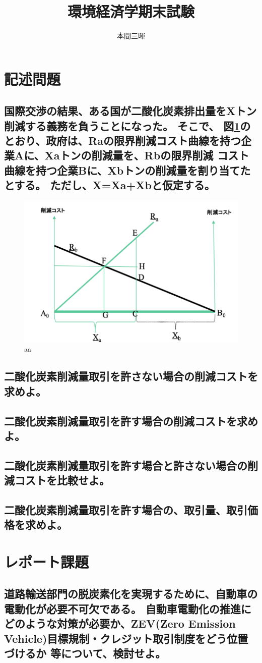 \documentclass[titlepage,a4paper]{jsarticle}
\title{環境経済学期末試験}
\author{本間三暉}
\begin{document}
\maketitle
\section{記述問題}
\subsection*{国際交渉の結果、ある国が二酸化炭素排出量をXトン削減する義務を負うことになった。
  そこで、 図\ref{環境図}のとおり、政府は、Raの限界削減コスト曲線を持つ企業Aに、Xaトンの削減量を、Rbの限界削減 コスト曲線を持つ企業Bに、Xbトンの削減量を割り当てたとする。
  ただし、X=Xa+Xbと仮定する。}
\begin{figure}[H]
  \centering
  \includegraphics[width=12cm]{img/env.png}
  \caption{aa}
  \label{環境図}
\end{figure}

\subsection{二酸化炭素削減量取引を許さない場合の削減コストを求めよ。}
\subsection{二酸化炭素削減量取引を許す場合の削減コストを求めよ。}
\subsection{二酸化炭素削減量取引を許す場合と許さない場合の削減コストを比較せよ。}
\subsection{二酸化炭素削減量取引を許す場合の、取引量、取引価格を求めよ。}

\section{レポート課題}
\subsection*{道路輸送部門の脱炭素化を実現するために、自動車の電動化が必要不可欠である。
  自動車電動化の推進にどのような対策が必要か、ZEV(Zero Emission Vehicle)目標規制・クレジット取引制度をどう位置づけるか 等について、検討せよ。}
\begin{thebibliography}{99}
  \bibitem{}
\end{thebibliography}
\end{document}
